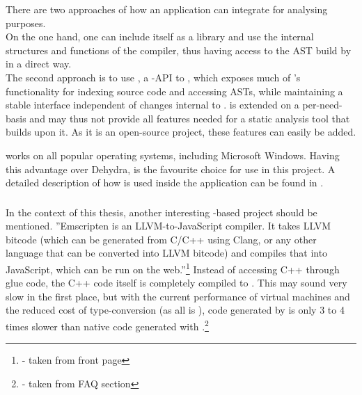 There are two approaches of how an application can integrate  for analysing purposes.
\\On the one hand, one can include  itself as a library and use the internal structures and functions of the compiler, thus having access to the AST build by  in a direct way.
\\The second approach is to use , a -API to , which exposes much of 's functionality for indexing source code and accessing ASTs, while maintaining a stable interface independent of changes internal to .  is extended on a per-need-basis and may thus not provide all features needed for a static analysis tool that builds upon it. As it is an open-source project, these features can easily be added.

 works on all popular operating systems, including Microsoft Windows. Having this advantage over Dehydra,  is the favourite choice for use in this project. A detailed description of how  is used inside the application can be found in .

\subsubsection{}

In the context of this thesis, another interesting -based project should be mentioned. ''Emscripten is an LLVM-to-JavaScript compiler. It takes LLVM bitcode (which can be generated from C/C++ using Clang, or any other language that can be converted into LLVM bitcode) and compiles that into JavaScript, which can be run on the web.''\footnote{\citep{EmscriptenHP} - taken from front page} Instead of accessing C++ through glue code, the C++ code itself is completely compiled to . This may sound very slow in the first place, but with the current performance of  virtual machines and the reduced cost of type-conversion (as all is ), code generated by  is only 3 to 4 times slower than native code generated with .\footnote{\citep{EmscriptenHP} - taken from FAQ section}